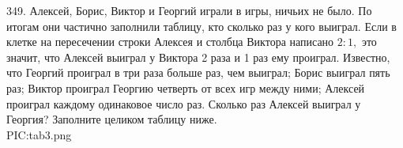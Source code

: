 349. Алексей, Борис, Виктор и Георгий играли в игры, ничьих не было. По итогам они частично заполнили таблицу, кто сколько раз у кого выиграл. Если в клетке на пересечении строки Алексея и столбца Виктора написано $2:1,$ это значит, что Алексей выиграл у Виктора 2 раза и 1 раз ему проиграл. Известно, что Георгий проиграл в три раза больше раз, чем выиграл; Борис выиграл пять раз; Виктор проиграл Георгию четверть от всех игр между ними; Алексей проиграл каждому одинаковое число раз. Сколько раз Алексей выиграл у Георгия? Заполните целиком таблицу ниже.\\
{{PIC:tab3.png}}\newpage\noindent
